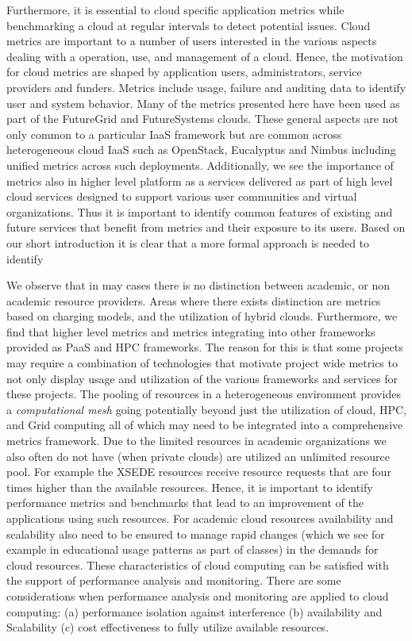 \documentclass{sig-alternate-05-2015}
\begin{document}
Furthermore, it is essential to cloud specific application metrics while benchmarking a cloud at regular intervals to detect potential issues. Cloud metrics are important to a number of users interested in the various aspects dealing with a operation, use, and management of a cloud. Hence, the motivation for cloud metrics are shaped by application users, administrators, service providers and funders. Metrics include usage, failure and auditing data to identify user and system behavior. Many of the metrics presented here have been used as part of the FutureGrid and FutureSystems clouds. These general aspects are not only common to a particular IaaS framework but are common across heterogeneous cloud IaaS such as OpenStack, Eucalyptus and Nimbus including unified metrics across such deployments.  Additionally, we see the importance of metrics also in higher level platform as a services delivered as part of high level cloud services designed to support various user communities and virtual organizations. Thus it is important to identify common features of existing and future services that benefit from metrics and their exposure to its users. Based on our short introduction it is clear that a more formal approach is needed to identify

We observe that in may cases there is no distinction between academic, or non academic resource providers. Areas where there exists distinction are metrics based on charging models, and the utilization of hybrid clouds. Furthermore, we find that higher level metrics and metrics integrating into other frameworks provided as PaaS and HPC frameworks. The reason for this is that some projects may require a combination of technologies that motivate project wide metrics to not only display usage and utilization of the various frameworks and services for these projects. The pooling of resources in a heterogeneous environment provides a {\it computational mesh} going potentially beyond just the utilization of cloud, HPC, and Grid computing all of which may need to be integrated into a comprehensive metrics framework. Due to the limited resources in academic organizations we also often do not have (when private clouds) are utilized an unlimited resource pool. For example the XSEDE resources receive resource requests that are four times higher than the available resources. Hence, it is important to identify performance metrics and benchmarks that lead to an improvement of the applications using such resources. For academic cloud resources availability and scalability also need to be ensured to manage rapid changes (which we see for example in educational usage patterns as part of classes) in the demands for cloud resources. These characteristics of cloud computing can be satisfied with the support of performance analysis and monitoring. There are some considerations when performance analysis and monitoring are applied to cloud computing: (a) performance isolation against interference (b) availability and Scalability (c) cost effectiveness to fully utilize available resources.
\end{document}
